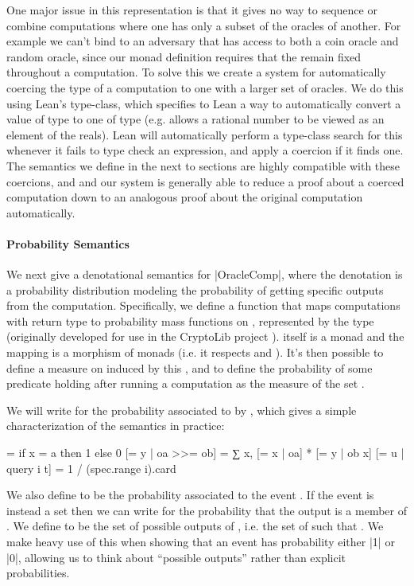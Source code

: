 One major issue in this representation is that it gives no way to sequence or combine computations where one has only a subset of the oracles of another.
For example we can't bind  to an adversary that has access to both a coin oracle and random oracle, since our monad definition requires that the  remain fixed throughout a computation.
To solve this we create a system for automatically coercing the type of a computation to one with a larger set of oracles.
We do this using Lean's  type-class, which specifies to Lean a way to automatically convert a value of type  to one of type  (e.g.  allows a rational number to be viewed as an element of the reals).
Lean will automatically perform a type-class search for this whenever it fails to type check an expression, and apply a coercion if it finds one.
The semantics we define in the next to sections are highly compatible with these coercions, and and our system is generally able to reduce a proof about a coerced computation down to an analogous proof about the original computation automatically.

\paragraph{Probability Semantics} \label{DistSemantics}
We next give a denotational semantics for \lean|OracleComp|, where the denotation is a probability distribution modeling the probability of getting specific outputs from the computation.  Specifically, we define a function  that maps computations with return type  to probability mass functions on , represented by the type  (originally developed for use in the CryptoLib project \cite{CryptoLib}).
 itself is a monad and the mapping is a morphism of monads (i.e. it respects  and ).
It's then possible to define a measure on  induced by this , and to define the probability of some predicate  holding after running a computation as the measure of the set .

We will write \lean{[= x | oa]} for the probability associated to  by , which gives a simple characterization of the semantics in practice:
\begin{leancode}
[= x | return a] = if x = a then 1 else 0
[= y | oa >>= ob] = ∑ x, [= x | oa] * [= y | ob x]
[= u | query i t] = 1 / (spec.range i).card
\end{leancode}
We also define \lean{[p | oa]} to be the probability associated to the event .
If the event is instead a set  then we can write \lean{[(· ∈ e) | oa]} for the probability that the output is a member of .
We define  to be the set of possible outputs of , i.e. the set of  such that .
We make heavy use of this when showing that an event has probability either \lean|1| or \lean|0|, allowing us to think about ``possible outputs'' rather than explicit probabilities.

